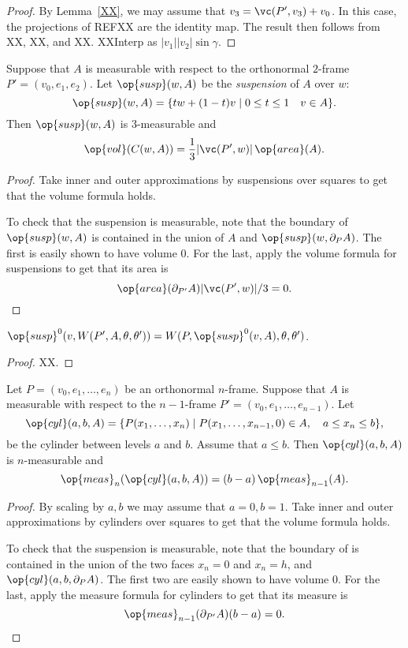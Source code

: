 \begin{proof} By Lemma~\ref{XX}, we may assume that $v_3 = \vc(P',v_3) +
v_0$.  In this case, the projections of REFXX are the identity map.
The result then follows from XX, XX, and XX.  XXInterp as
$|v_1||v_2|\sin\gamma$.
\end{proof}

\begin{lemma}[suspension] Suppose
that $A$ is measurable with respect to the orthonormal $2$-frame
$P'=(v_0,e_1,e_2)$.  Let $\op{susp}(w,A)$ be the {\it suspension\/}
of $A$ over $w$:
    $$
    \op{susp}(w,A) = \{ t w + (1-t) v \mid 0\le t\le 1\quad v\in
    A\}.
    $$
Then $\op{susp}(w,A)$ is $3$-measurable and
    $$
    \op{vol}(C(w,A)) = \frac{1}{3} |\vc(P',w)|\, \op{area}(A).
    $$
\end{lemma}

\begin{proof}
Take inner and outer approximations by suspensions over squares to
get that the volume formula holds.

To check that the suspension is measurable, note that the boundary
of $\op{susp}(w,A)$ is contained in the union of $A$ and
$\op{susp}(w,\partial_P A)$. The first is easily shown to have
volume $0$. For the last, apply the volume formula for suspensions
to get that its area is
$$\op{area}(\partial_{P'} A) |\vc(P',w)| /3 = 0.$$
\end{proof}

\begin{lemma}  $\op{susp}^0(v,W(P',A,\theta,\theta')) =
W(P,\op{susp}^0(v,A),\theta,\theta')$.
\end{lemma}

\begin{proof} XX.
\end{proof}

\begin{lemma}[cylinder] Let $P=(v_0,e_1,\ldots,e_n)$ be an orthonormal $n$-frame.  Suppose
that $A$ is measurable with respect to the $n-1$-frame
$P'=(v_0,e_1,\ldots,e_{n-1})$.  Let
    $$
    \op{cyl}(a,b,A) = \{ P(x_1,\ldots,x_n) \mid P(x_1,\ldots,x_{n-1},0)\in A,
    \quad a\le x_n\le b\},
    $$
be the cylinder between levels $a$ and $b$.   Assume that $a\le b$.
Then $\op{cyl}(a,b,A)$ is $n$-measurable and
    $$
    \op{meas}_n(\op{cyl}(a,b,A)) = (b-a)\,\op{meas}_{n-1}(A).
    $$
\end{lemma}

\begin{proof}
By scaling by $a,b$ we may assume that $a=0,b=1$.  Take inner and
outer approximations by cylinders over squares to get that the
volume formula holds.

To check that the suspension is measurable, note that the boundary
of is contained in the union of the two faces $x_n=0$ and $x_n=h$,
and $\op{cyl}(a,b,\partial_P A)$. The first two are easily shown to
have volume $0$.  For the last, apply the measure formula for
cylinders to get that its measure is
$$\op{meas}_{n-1}(\partial_{P'} A)(b-a) = 0.$$
\end{proof}


